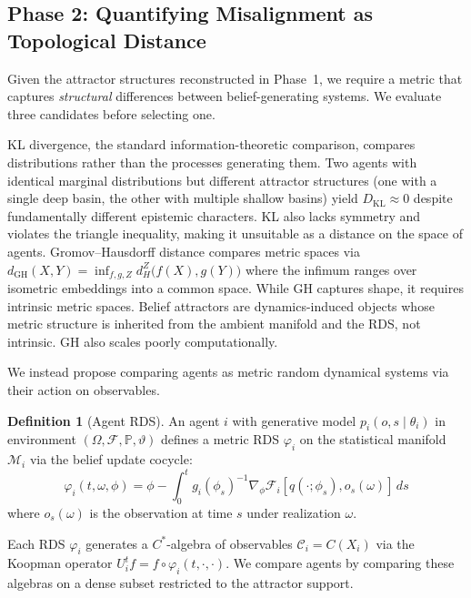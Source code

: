 \documentclass[11pt,a4paper]{article}
\theoremstyle{definition}
\newtheorem{definition}[claim]{Definition}
\newcommand{\VFE}{\mathcal{F}}
\newcommand{\cM}{\mathcal{M}}
\newcommand{\cC}{\mathcal{C}}
\newcommand{\cF}{\mathcal{F}}  %
\newcommand{\dkl}{D_{\mathrm{KL}}}
\begin{document}
\subsection{Phase 2: Quantifying Misalignment as Topological Distance}
\label{sec:phase2}

Given the attractor structures reconstructed in Phase~1, we require a metric that captures \emph{structural} differences between belief-generating systems. We evaluate three candidates before selecting one.

KL divergence, the standard information-theoretic comparison, compares distributions rather than the processes generating them. Two agents with identical marginal distributions but different attractor structures (one with a single deep basin, the other with multiple shallow basins) yield $\dkl \approx 0$ despite fundamentally different epistemic characters. KL also lacks symmetry and violates the triangle inequality, making it unsuitable as a distance on the space of agents. Gromov--Hausdorff distance compares metric spaces via $d_{\mathrm{GH}}(X, Y) = \inf_{f, g, Z} d_H^Z\bigl(f(X), g(Y)\bigr)$ where the infimum ranges over isometric embeddings into a common space. While GH captures shape, it requires intrinsic metric spaces. Belief attractors are dynamics-induced objects whose metric structure is inherited from the ambient manifold and the RDS, not intrinsic. GH also scales poorly computationally.

We instead propose comparing agents as metric random dynamical systems via their action on observables.

\begin{definition}[Agent RDS]
\label{def:agent_rds}
An agent $i$ with generative model $p_i(o, s \mid \theta_i)$ in environment $(\Omega, \cF, \mathbb{P}, \vartheta)$ defines a metric RDS $\varphi_i$ on the statistical manifold $\cM_i$ via the belief update cocycle:
\begin{equation}
  \varphi_i(t, \omega, \phi) = \phi - \int_0^t g_i(\phi_s)^{-1} \nabla_\phi \VFE_i[q(\cdot; \phi_s), o_s(\omega)] \, ds
  \label{eq:agent_rds}
\end{equation}
where $o_s(\omega)$ is the observation at time $s$ under realization $\omega$.
\end{definition}

Each RDS $\varphi_i$ generates a $C^*$-algebra of observables $\cC_i = C(X_i)$ via the Koopman operator $U_i^t f = f \circ \varphi_i(t, \cdot, \cdot)$. We compare agents by comparing these algebras on a dense subset restricted to the attractor support.
\end{document}
